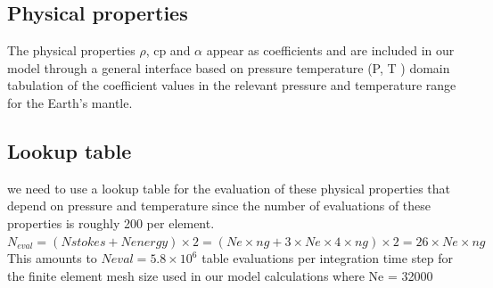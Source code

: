 \documentclass[11pt]{article}
\begin{document}
\subsection{Physical properties}
The physical properties $\rho$, cp and $\alpha$
appear as coefficients and are included in our model through a general interface based on
pressure temperature (P, T ) domain tabulation of the coefficient values in the relevant pressure and
temperature range for the Earth’s mantle.
\subsection{Lookup table}
we need to use a lookup table for the evaluation of these physical properties that depend on pressure and temperature since the number of evaluations of these properties is roughly 200 per element.
$N_{eval} = (Nstokes + Nenergy ) \times 2 = (Ne \times ng + 3 \times Ne \times 4 \times ng ) \times 2 = 26 \times Ne \times ng$
This amounts to $Neval = 5.8 \times 10^{6}$ table evaluations per integration time step for the finite element mesh size used in our model calculations where Ne = 32000
\end{document}

